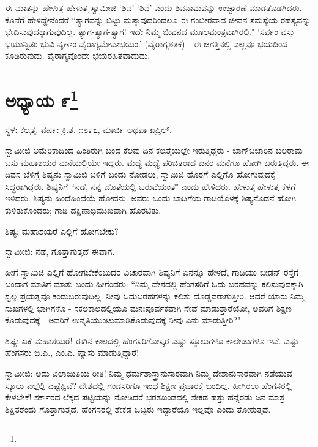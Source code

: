 ಈ ಮಾತನ್ನು ಹೇಳುತ್ತ ಹೇಳುತ್ತ ಸ್ವಾಮೀಜಿ ‘ಶಿವ’ ‘ಶಿವ’ ಎಂದು ಶಿವನಾಮವನ್ನು ಉಚ್ಚಾರಣೆ ಮಾಡತೊಡಗಿದರು. ಕೊನೆಗೆ ಹೇಳಿದ್ದೇನೆಂದರೆ “ತ್ಯಾಗವನ್ನು ಬಿಟ್ಟು ಮತ್ತಾವುದರಿಂದಲೂ ಈ ಗಂಭೀರವಾದ ಜೀವನ ಸಮಸ್ಯೆಯ ರಹಸ್ಯವನ್ನು ಭೇದಿಸುವುದಕ್ಕಾಗುವುದಿಲ್ಲ. ತ್ಯಾಗ-ತ್ಯಾಗ-ತ್ಯಾಗ! ಇದೇ ನಿಮ್ಮ ಜೀವನದ ಮೂಲಮಂತ್ರವಾಗಿರಲಿ." ‘ಸರ್ವಂ ವಸ್ತು ಭಯಾನ್ವಿತಂ ಭುವಿ ನೃಣಾಂ ವೈರಾಗ್ಯಮೇವಾಭಯಂ.’ (ವೈರಾಗ್ಯಶತಕ) - ಈ ಜಗತ್ತಿನಲ್ಲಿ ಎಲ್ಲವೂ ಭಯದಿಂದ ಕೂಡಿರುವುದು. ವೈರಾಗ್ಯವೊಂದೇ ಭಯರಹಿತವಾದುದು.

\newpage

\chapter[ಅಧ್ಯಾಯ ೯]{ಅಧ್ಯಾಯ ೯\protect\footnote{}}

\centerline{ಸ್ಥಳ: ಕಲ್ಕತ್ತ, ವರ್ಷ: ಕ್ರಿ.ಶ. ೧೮೯೭, ಮಾರ್ಚಿ ಅಥವಾ ಏಪ್ರಿಲ್.}

ಸ್ವಾಮೀಜಿ ಅಮೆರಿಕಾದಿಂದ ಹಿಂತಿರುಗಿ ಬಂದ ಕೆಲವು ದಿನ ಕಲ್ಕತ್ತೆಯಲ್ಲೇ ಇರುತ್ತಿದ್ದರು - ಬಾಗ್‌ಬಜಾರಿನ ಬಲರಾಮ ಬಸು ಮಹಾಶಯರ ಮನೆಯಲ್ಲಿಯೇ ಇದ್ದರು. ಮಧ್ಯೆ ಮಧ್ಯೆ ಪರಿಚಿತರಾದ ಜನರ ಮನೆಗೂ ಹೋಗಿ ಬರುತ್ತಿದ್ದರು. ಈ ದಿವಸ ಬೆಳಿಗ್ಗೆ ಶಿಷ್ಯನು ಸ್ವಾಮಿಜಿ ಬಳಿಗೆ ಬಂದು ನೋಡಲು, ಸ್ವಾಮಿಜಿ ಹೊರಗೆ ಎಲ್ಲಿಗೊ ಹೋಗುವುದಕ್ಕೆ ಸಿದ್ಧರಾಗಿದ್ದರು. ಶಿಷ್ಯನಿಗೆ “ನಡೆ, ನನ್ನ ಜೊತೆಯಲ್ಲಿ ಬರುವೆಯಂತೆ" ಎಂದು ಹೇಳಿದರು. ಹೇಳುತ್ತ ಹೇಳುತ್ತ ಕೆಳಗೆ ಇಳಿದರು. ಶಿಷ್ಯನು ಹಿಂದೆಹಿಂದೆಯೆ ಹೋದನು. ಅವರು ಒಂದು ಬಾಡಿಗೆಯ ಗಾಡಿಯೊಳಕ್ಕೆ ಶಿಷ್ಯನೊಡನೆ ಹೋಗಿ ಕುಳಿತುಕೊಂಡರು; ಗಾಡಿ ದಕ್ಷಿಣಾಭಿಮುಖವಾಗಿ ಹೊರಟಿತು.

ಶಿಷ್ಯ: ಮಹಾಶಯರೆ ಎಲ್ಲಿಗೆ ಹೋಗಬೇಕು?

ಸ್ವಾಮೀಜಿ: ನಡೆ, ಗೊತ್ತಾಗುತ್ತದೆ ಈವಾಗ.

ಹೀಗೆ ಸ್ವಾಮಿಜಿ ಎಲ್ಲಿಗೆ ಹೋಗಬೇಕೆಂಬುದರ ವಿಚಾರವಾಗಿ ಶಿಷ್ಯನಿಗೆ ಏನನ್ನೂ ಹೇಳದೆ, ಗಾಡಿಯು ಬೀಡನ್ ರಸ್ತೆಗೆ ಬಂದಾಗ ಮಾತಿಗೆ ಮಾತು ಬಂದು ಹೀಗೆಂದರು: “ನಿಮ್ಮ ದೇಶದಲ್ಲಿ ಹೆಂಗಸರಿಗೆ ಓದು ಬರಹವನ್ನು ಕಲಿಸುವುದಕ್ಕಾಗಿ ಸ್ವಲ್ಪ ಪ್ರಯತ್ನವೂ ಕಂಡುಬರುವುದಿಲ್ಲ. ನೀವು ಓದುಬರಹಗಳನ್ನು ಕಲಿತು ದೊಡ್ಡವರಾಗುತ್ತೀರಿ. ಆದರೆ ಯಾರು ನಿಮ್ಮ ಸುಖಗಳಲ್ಲಿ ಭಾಗಿಗಳೊ - ಸಕಲಕಾಲದಲ್ಲಿಯೂ ಮನಃಪೂರ್ವಕವಾಗಿ ಸೇವೆ ಮಾಡುತ್ತಾರೆಯೋ, ಅವರಿಗೆ ಶಿಕ್ಷಣ ಕೊಡುವುದಕ್ಕೆ - ಅವರಿಗೆ ಉನ್ನತಿಯುಂಟುಮಾಡಿಕೊಡುವುದಕ್ಕೆ ನೀವು ಏನು ಮಾಡುತ್ತೀರಿ?"

ಶಿಷ್ಯ: ಏಕೆ ಮಹಾಶಯರೆ! ಈಗಿನ ಕಾಲದಲ್ಲಿ ಹೆಂಗಸರಿಗೋಸ್ಕರ ಎಷ್ಟು ಸ್ಕೂಲುಗಳೂ ಕಾಲೇಜುಗಳೂ ಇವೆ. ಎಷ್ಟು ಹೆಂಗಸರು ಬಿ.ಎ., ಎಂ.ಎ. ಪ್ಯಾಸು ಮಾಡುತ್ತಿದ್ದಾರೆ!

ಸ್ವಾಮೀಜಿ: ಅದು ವಿಲಾಯಿತಿಯ ರೀತಿ! ನಿಮ್ಮ ಧರ್ಮಶಾಸ್ತ್ರಾನುಸಾರವಾಗಿ ನಿಮ್ಮ ದೇಶಾನುಸಾರವಾಗಿ ನಡೆಯುವ ಸ್ಕೂಲು ಎಲ್ಲೆಲ್ಲಿ ಎಷ್ಟೆಷ್ಟಿವೆ? ದೇಶದಲ್ಲಿ ಗಂಡಸರಿಗೂ ಇಂಥ ಶಿಕ್ಷಣ ಪ್ರಚಾರಕ್ಕೆ ಬಂದಿಲ್ಲ. ಹೀಗಿರಲು ಹೆಂಗಸರಲ್ಲಿ ಕೇಳಬೇಕೆ! ಸರ್ಕಾರದ ಲೆಕ್ಕದ ಪಟ್ಟಿಯನ್ನು ನೋಡಿದರೆ ಭರತಖಂಡದಲ್ಲಿ ಶೇಕಡ ಹತ್ತು ಹನ್ನೆರಡು ಜನ ಮಾತ್ರ ಶಿಕ್ಷಿತರೆಂದು ಗೊತ್ತಾಗುತ್ತದೆ. ಹೆಂಗಸರಲ್ಲಿ ಶೇಕಡ ಒಬ್ಬರು ಇದ್ದಾರೆಯೊ ಇಲ್ಲವೊ ಎಂದು ತೋರುತ್ತದೆ.

